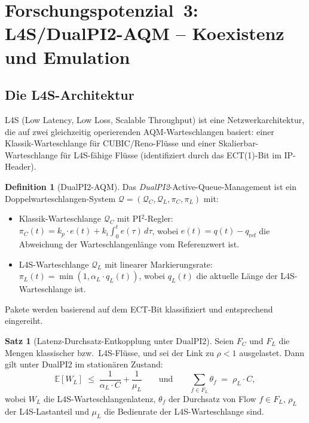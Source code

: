 ﻿\documentclass[a4paper,12pt]{article}
\theoremstyle{definition}
\newtheorem{definition}{Definition}
\newtheorem{satz}{Satz}
\begin{document}
\section{Forschungspotenzial~3: L4S/DualPI2-AQM -- Koexistenz und Emulation}

\subsection{Die L4S-Architektur}

L4S (Low Latency, Low Loss, Scalable Throughput) \cite{briscoe2023l4s} ist eine
Netzwerkarchitektur, die auf zwei gleichzeitig operierenden AQM-Warteschlangen
basiert: einer Klassik-Warteschlange f\"{u}r CUBIC/Reno-Fl\"{u}sse und einer
Skalierbar-Warteschlange f\"{u}r L4S-f\"{a}hige Fl\"{u}sse (identifiziert durch das
ECT(1)-Bit im IP-Header).

\begin{definition}[DualPI2-AQM]
    Das \emph{DualPI2}-Active-Queue-Management ist ein Doppelwarteschlangen-System
    $\mathcal{Q} = (\mathcal{Q}_C, \mathcal{Q}_L, \pi_C, \pi_L)$ mit:
    \begin{itemize}
        \item Klassik-Warteschlange $\mathcal{Q}_C$ mit PI$^2$-Regler:
              $\pi_C(t) = k_p \cdot e(t) + k_i \int_0^t e(\tau)\,d\tau$,
              wobei $e(t) = q(t) - q_{\mathrm{ref}}$ die Abweichung der
              Warteschlangenlänge vom Referenzwert ist.
        \item L4S-Warteschlange $\mathcal{Q}_L$ mit linearer Markierungsrate:
              $\pi_L(t) = \min(1, \alpha_L \cdot q_L(t))$, wobei $q_L(t)$
              die aktuelle L\"{a}nge der L4S-Warteschlange ist.
    \end{itemize}
    Pakete werden basierend auf dem ECT-Bit klassifiziert und entsprechend
    eingereiht.
\end{definition}

\begin{satz}[Latenz-Durchsatz-Entkopplung unter DualPI2]
    \label{satz:dualpi2}
    Seien $F_C$ und $F_L$ die Mengen klassischer bzw.\ L4S-Fl\"{u}sse, und sei
    der Link zu $\rho < 1$ ausgelastet. Dann gilt unter DualPI2 im station\"{a}ren
    Zustand:
    \[
        \mathbb{E}[W_L] \;\leq\; \frac{1}{\alpha_L \cdot C} + \frac{1}{\mu_L}
        \qquad \text{und} \qquad
        \sum_{f \in F_L} \theta_f \;=\; \rho_L \cdot C,
    \]
    wobei $W_L$ die L4S-Warteschlangenlatenz, $\theta_f$ der Durchsatz von
    Flow $f \in F_L$, $\rho_L$ der L4S-Lastanteil und $\mu_L$ die
    Bedienrate der L4S-Warteschlange sind.
\end{satz}
\end{document}
